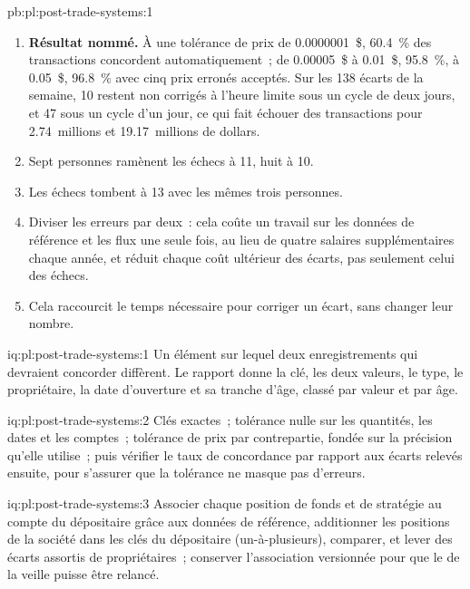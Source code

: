 \begin{solution}{pb:pl:post-trade-systems:1}
\begin{enumerate}
\item \textbf{Résultat nommé.} À une tolérance de prix de 0.0000001~\$, 60.4~\% des transactions concordent automatiquement~; de 0.00005~\$ à 0.01~\$, 95.8~\%, à
0.05~\$, 96.8~\% avec cinq prix erronés acceptés. Sur les 138 écarts de la semaine, 10 restent non corrigés à l'heure limite sous un cycle de deux jours, et 47 sous un
cycle d'un jour, ce qui fait échouer des transactions pour 2.74~millions et 19.17~millions de dollars.
\item Sept personnes ramènent les échecs à 11, huit à 10.
\item Les échecs tombent à 13 avec les mêmes trois personnes.
\item Diviser les erreurs par deux~: cela coûte un travail sur les données de référence et les flux une seule fois, au lieu de quatre salaires supplémentaires chaque année, et réduit chaque
coût ultérieur des écarts, pas seulement celui des échecs.
\item Cela raccourcit le temps nécessaire pour corriger un écart, sans changer leur nombre.
\end{enumerate}
\end{solution}

\begin{solution}{iq:pl:post-trade-systems:1}
Un élément sur lequel deux enregistrements qui devraient concorder diffèrent. Le rapport donne la clé, les deux valeurs, le type, le propriétaire, la date d'ouverture et sa
tranche d'âge, classé par valeur et par âge.
\end{solution}

\begin{solution}{iq:pl:post-trade-systems:2}
Clés exactes~; tolérance nulle sur les quantités, les dates et les comptes~; tolérance de prix par contrepartie, fondée sur la précision qu'elle utilise~; puis vérifier le taux de
concordance par rapport aux écarts relevés ensuite, pour s'assurer que la tolérance ne masque pas d'erreurs.
\end{solution}

\begin{solution}{iq:pl:post-trade-systems:3}
Associer chaque position de fonds et de stratégie au compte du dépositaire grâce aux données de référence, additionner les positions de la société dans les clés du dépositaire
(un-à-plusieurs), comparer, et lever des écarts assortis de propriétaires~; conserver l'association versionnée pour que le  de la veille puisse être relancé.
\end{solution}


